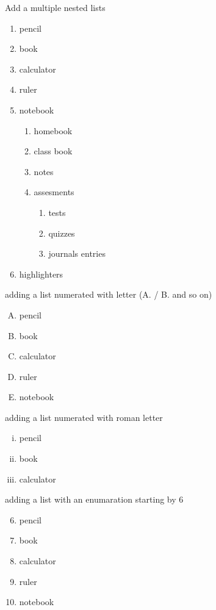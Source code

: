 \documentclass[12pt]{article}
\begin{document}
Add a multiple nested lists

\begin{enumerate}
    \item pencil
    \item book
    \item calculator
    \item ruler
    \item notebook
          \begin{enumerate}[1.]
              \item homebook
              \item class book
              \item notes
              \item assesments
                    \begin{enumerate}
                        \item tests
                        \item quizzes
                        \item journals entries
                    \end{enumerate}
          \end{enumerate}
    \item highlighters
\end{enumerate}

\vspace*{1cm}

adding a list numerated with letter (A. / B. and so on)
\begin{enumerate}[A.]
    \item pencil
    \item book
    \item calculator
    \item ruler
    \item notebook
\end{enumerate}

\vspace{1cm}

adding a list numerated with roman letter
\begin{enumerate}[i.]
    \item pencil
    \item book
    \item calculator
\end{enumerate}

\pagebreak

adding a list with an enumaration starting by 6
\begin{enumerate} \setcounter{enumi}{5}
    \item pencil
    \item book
    \item calculator
    \item ruler
    \item notebook
\end{enumerate}
\end{document}
